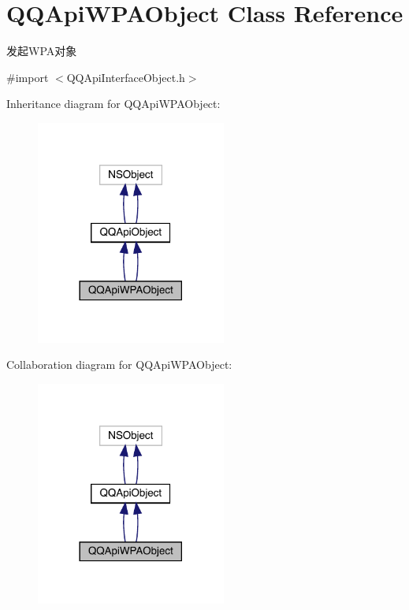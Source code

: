 \hypertarget{interface_q_q_api_w_p_a_object}{}\section{Q\+Q\+Api\+W\+P\+A\+Object Class Reference}
\label{interface_q_q_api_w_p_a_object}


发起\+W\+P\+A对象  




{\ttfamily \#import $<$Q\+Q\+Api\+Interface\+Object.\+h$>$}



Inheritance diagram for Q\+Q\+Api\+W\+P\+A\+Object\+:\nopagebreak
\begin{figure}[H]
\begin{center}
\leavevmode
\includegraphics[width=177pt]{interface_q_q_api_w_p_a_object__inherit__graph}
\end{center}
\end{figure}


Collaboration diagram for Q\+Q\+Api\+W\+P\+A\+Object\+:\nopagebreak
\begin{figure}[H]
\begin{center}
\leavevmode
\includegraphics[width=177pt]{interface_q_q_api_w_p_a_object__coll__graph}
\end{center}
\end{figure}

